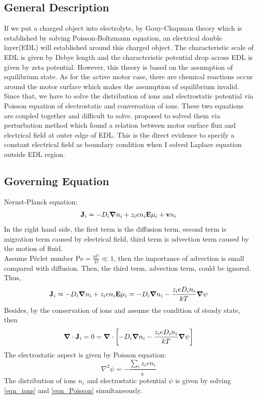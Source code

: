 \documentclass[fontsize=11pt, %
                             paper=a4, %
                             twoside, %
                             captions=tableheading,
                             index=totoc,
                             hyperref]{labbook}
\begin{document}
\begin{addmargin}[4cm]{0cm}
\subsection{General Description}
If we put a charged object into electrolyte, by Gouy-Chapman theory which is established by solving Poisson-Boltzmann equation, an electrical double layer(EDL) will established around this charged object. The characteristic scale of EDL is given by Debye length and the characteristic potential drop across EDL is given by zeta potential. However, this theory is based on the assumption of equilibrium state. As for the active motor case, there are chemical reactions occur around the motor surface which makes the assumption of equilibrium invalid. Since that, we have to solve the distribution of ions and electrostatic potential via Poisson equation of electrostatic and conversation of ions. These two equations are coupled together and difficult to solve. \cite{Kline2006} proposed to solved them via perturbation method which found a relation between motor surface flux and electrical field at outer edge of EDL. This is the direct evidence to specify a constant electrical field as boundary condition when I solved Laplace equation outside EDL region.
\subsection{Governing Equation}
Nernst-Planck equation:
\begin{equation}
\mathbf{J}_i = -D_i\mbox{\boldmath$ \nabla $} n_i + z_i e n_i \mathbf{E} \mu_i +\mathbf{v} n_i
\end{equation}
In the right hand side, the first term is the diffusion term, second term is migration term caused by electrical field, third term is advection term caused by the motion of fluid.\\
Assume Péclet number $\mathrm{Pe}=\frac{aU}{D}\ll 1$, then the importance of advection is small compared with diffusion. Then, the third term, advection term, could be ignored. Thus,
\begin{equation}
\mathbf{J}_i \approx -D_i\mbox{\boldmath$ \nabla $} n_i + z_i e n_i \mathbf{E} \mu_i=-D_i\mbox{\boldmath$ \nabla $} n_i - \frac{z_i e D_i n_i}{kT}\mbox{\boldmath$ \nabla $} \psi
\end{equation}
Besides, by the conservation of ions and assume the condition of steady state, then
\begin{equation}\label{eqn_ions}
\mbox{\boldmath$ \nabla $} \cdot \mathbf{J}_i =0=\mbox{\boldmath$ \nabla $} \cdot \left[-D_i\mbox{\boldmath$ \nabla $} n_i - \frac{z_i e D_i n_i}{kT}\mbox{\boldmath$ \nabla $} \psi\right]
\end{equation}
The electrostatic aspect is given by Poisson equation:
\begin{equation}\label{eqn_Poisson}
\nabla^2 \psi = - \frac{\sum_i z_i e n_i}{\epsilon}
\end{equation}
The distribution of ions $n_i$ and electrostatic potential $\psi$ is given by solving \ref{eqn_ions} and \ref{eqn_Poisson} simultaneously.

\end{addmargin}
\end{document}
